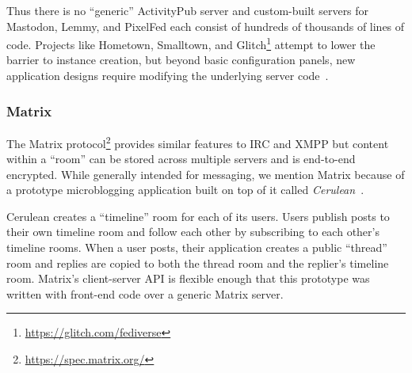Thus there is no ``generic'' ActivityPub server
and custom-built servers
for Mastodon, Lemmy, and PixelFed each consist of hundreds
of thousands of lines of code.
Projects like Hometown, Smalltown, and Glitch\footnote{
    \url{https://glitch.com/fediverse}
} attempt to lower the barrier
to instance creation, but beyond basic configuration panels,
new application designs require modifying the underlying server code~\cite{smalltown,runyourownsocial}.




\subsubsection{Matrix}

The Matrix protocol\footnote{
    \url{https://spec.matrix.org/}
}
provides similar features to IRC and XMPP but content within a ``room''
can be stored across multiple servers and is end-to-end encrypted.
While generally intended for messaging, we mention Matrix because of a
prototype microblogging application built on top of it called \emph{Cerulean}~\cite{cerulean}.

Cerulean creates a ``timeline'' room for each of its users.
Users publish posts to their own timeline room
and follow each other by subscribing to each other's timeline rooms.
When a user posts, their application creates a
public ``thread'' room and replies are copied to both the
thread room and the replier's timeline room.
Matrix's client-server API is flexible enough that this prototype
was written with front-end code over a generic Matrix server.

